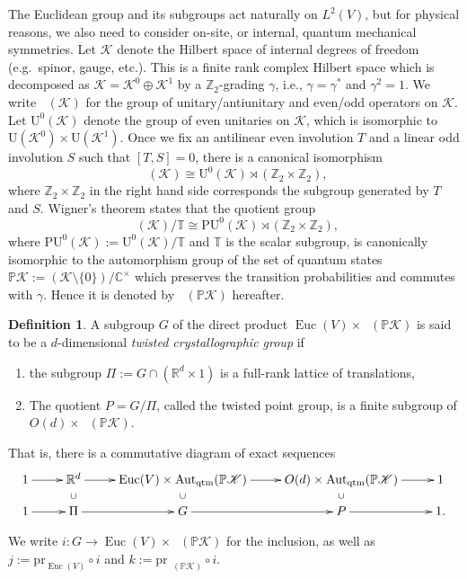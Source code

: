 \documentclass[11pt]{amsart}
\theoremstyle{definition}
\newtheorem{defn}[equation]{Definition}
\theoremstyle{plain}
\theoremstyle{remark}
\newcommand{\bC}{\mathbb{C}}
\newcommand{\bP}{\mathbb{P}}
\newcommand{\bR}{\mathbb{R}}
\newcommand{\bT}{\mathbb{T}}
\newcommand{\bZ}{\mathbb{Z}}
\newcommand{\rmP}{\mathrm{P}}
\newcommand{\rmU}{\mathrm{U}}
\newcommand{\sK}{\mathscr{K}}
\DeclareMathOperator{\Euc}{Euc}
\newcommand{\pr}{\mathrm{pr}}
\DeclareMathOperator{\qAut}{\mathrm{Aut}_{\mathrm{qtm}}}
\begin{document}
The Euclidean group and its subgroups act naturally on $L^2(V)$, but for physical reasons, we also need to consider on-site, or internal, quantum mechanical symmetries.
Let $\sK$ denote the Hilbert space of internal degrees of freedom (e.g.\ spinor, gauge, etc.). 
This is a finite rank complex Hilbert space which is decomposed as $\sK=\sK^0 \oplus \sK^1$ by a $\bZ_2$-grading $\gamma$, i.e., $\gamma = \gamma^*$ and $\gamma^2=1$. 
We write $\qAut (\sK)$ for the group of unitary/antiunitary and even/odd operators on $\sK$. Let $\rmU^0(\sK)$ denote the group of even unitaries on $\sK$, which is isomorphic to $\rmU(\sK^0) \times \rmU(\sK^1)$.
Once we fix an antilinear even involution $T$ and a linear odd involution $S$ such that $[T,S]=0$, there is a canonical isomorphism
\[\qAut(\sK) \cong \mathrm{U}^0(\sK) \rtimes (\bZ_2 \times \bZ_2),\]
where $\bZ_2 \times \bZ_2$ in the right hand side corresponds the subgroup generated by $T$ and $S$.
Wigner's theorem \cite{freedWignerTheorem2012} states that the quotient group 
\[ \qAut (\sK) /\bT \cong \rmP \rmU^0(\sK) \rtimes (\bZ_2 \times \bZ_2), \]
where $\rmP \rmU ^0 (\sK):= \rmU ^0 (\sK)/\bT$ and $\bT$ is the scalar subgroup, is canonically isomorphic to the automorphism group of the set of quantum states $\bP\sK:=(\sK \setminus \{ 0 \}) / \bC^\times $ which preserves the transition probabilities and commutes with $\gamma$. Hence it is denoted by $\qAut (\bP \sK)$ hereafter. 



\begin{defn}\label{defn:twcry}
A subgroup $G$ of the direct product $\Euc(V) \times  \qAut (\bP \sK)$ is said to be a $d$-dimensional \emph{twisted crystallographic group} if
\begin{enumerate}
\item the subgroup $\Pi:= G \cap (\bR^d \times 1)$ is a full-rank lattice of translations, 
\item The quotient $P = G/\Pi $, called the twisted point group, is a finite subgroup of $O(d) \times \qAut(\bP \sK)$.
\end{enumerate}
That is, there is a commutative diagram of exact sequences
\[
\xymatrix@R=1em{
1 \ar[r] & \bR^d \ar@{}[d]|{\cup} \ar[r]  & \Euc (V ) \times  \qAut (\bP \sK) \ar[r]\ar@{}[d]|{\cup}  & O(d)\times  \qAut (\bP \sK) \ar[r]\ar@{}[d]|{\cup}  & 1 \\
1 \ar[r] & \Pi \ar[r] & G \ar[r] & P  \ar[r] & 1.
}
\]
\end{defn}


We write $i \colon G \to \mathop{\mathrm{Euc}}(V ) \times \qAut(\bP\sK )$ for the inclusion, as well as $j:=\pr_{\Euc (V)} \circ i$ and $k:=\pr_{\qAut(\bP\sK )} \circ i$.
\end{document}
